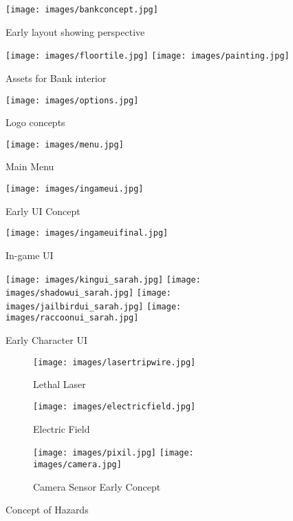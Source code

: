 \documentclass[11pt]{report}
\begin{document}
\begin{figure}[H]
	\texttt{[image: images/bankconcept.jpg]}
    \caption{Early layout showing perspective}
\end{figure}

\begin{figure}[H]
    \centering
    \texttt{[image: images/floortile.jpg]}
    \texttt{[image: images/painting.jpg]}
    \caption{Assets for Bank interior}
\end{figure}

\begin{figure}[H]
	\texttt{[image: images/options.jpg]}
    \caption{Logo concepts}
\end{figure}

\begin{figure}[H]
	\texttt{[image: images/menu.jpg]}
    \caption{Main Menu}
\end{figure}

\begin{figure}[H]
	\texttt{[image: images/ingameui.jpg]}
    \caption{Early UI Concept}
\end{figure}

\begin{figure}[H]
	\texttt{[image: images/ingameuifinal.jpg]}
    \caption{In-game UI}
\end{figure}

\begin{figure}[H]
    \centering
	\texttt{[image: images/kingui\_sarah.jpg]}
	\texttt{[image: images/shadowui\_sarah.jpg]}
	\texttt{[image: images/jailbirdui\_sarah.jpg]}
	\texttt{[image: images/raccoonui\_sarah.jpg]}
    \caption{Early Character UI}
\end{figure}

\begin{figure}[H]
    \centering
    \begin{subfigure}[b]{0.4\linewidth}
        \texttt{[image: images/lasertripwire.jpg]}
        \caption{Lethal Laser}
    \end{subfigure}
    \begin{subfigure}[b]{0.4\linewidth}
        \texttt{[image: images/electricfield.jpg]}
        \caption{Electric Field}
    \end{subfigure}
    \begin{subfigure}[b]{\linewidth}
        \centering
        \texttt{[image: images/pixil.jpg]}
        \texttt{[image: images/camera.jpg]}
        \caption{Camera Sensor Early Concept}
    \end{subfigure}
    \caption{Concept of Hazards}
\end{figure}
\end{document}
